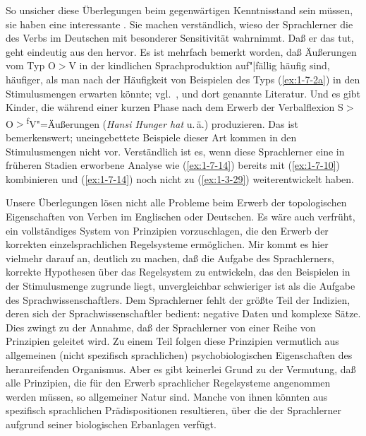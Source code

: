 \documentclass[output=paper]{langsci/langscibook}
\begin{document}
So unsicher diese Überlegungen beim gegenwärtigen Kenntnisstand sein müssen,
sie haben eine interessante . Sie machen verständlich, wieso der Sprachlerner die  des Verbs im Deutschen mit besonderer Sensitivität wahrnimmt. Daß er das tut, geht eindeutig aus den  hervor. Es ist
mehrfach bemerkt worden, daß Äußerungen vom Typ O$>$V in der kindlichen
Sprachproduktion auf"|fällig häufig sind, häufiger, als man nach der Häufigkeit von
Beispielen des Typs (\ref{ex:1-7-2a}) in den Stimulusmengen erwarten könnte; vgl.\ \citet{Park1981},
\citet{Clahsen1982} und dort genannte Literatur. Und es gibt Kinder, die während einer
kurzen Phase nach dem Erwerb der Verbalflexion S$>$O$>$\textsuperscript{f}V"=Äußerungen (\textit{Hansi Hunger hat} u.\,ä.) produzieren. Das ist bemerkenswert; uneingebettete Beispiele dieser Art kommen in den Stimulusmengen nicht vor. Verständlich ist es, wenn diese
Sprachlerner eine in früheren Stadien erworbene Analyse wie (\ref{ex:1-7-14}) bereits mit (\ref{ex:1-7-10})
kombinieren und (\ref{ex:1-7-14}) noch nicht zu (\ref{ex:1-3-29}) weiterentwickelt haben.



\ssubsection{}%
\label{subsec:1-7.4}
Unsere Überlegungen lösen nicht alle Probleme beim Erwerb der
topologischen Eigenschaften von Verben im Englischen oder
Deutschen. Es wäre auch verfrüht, ein vollständiges System von
Prinzipien vorzuschlagen, die den Erwerb der korrekten
einzelsprachlichen Regelsysteme ermöglichen. Mir kommt es hier
vielmehr darauf an, deutlich zu machen, daß die Aufgabe des
Sprachlerners, korrekte Hypothesen über das Regelsystem zu entwickeln,
das den Beispielen in der Stimulusmenge zugrunde liegt, unvergleichbar
schwieriger ist als die Aufgabe des Sprachwissenschaftlers. Dem
Sprachlerner fehlt der größte Teil der Indizien, deren sich der
Sprachwissenschaftler bedient: negative Daten und komplexe Sätze. Dies
zwingt zu der Annahme, daß der Sprachlerner von einer Reihe von
Prinzipien geleitet wird. Zu einem Teil folgen diese Prinzipien
vermutlich aus allgemeinen (nicht spezifisch sprachlichen)
psychobiologischen Eigenschaften des heranreifenden Organismus. Aber
es gibt keinerlei Grund zu der Vermutung, daß alle Prinzipien, die für
den Erwerb sprachlicher Regelsysteme angenommen werden müssen, so
allgemeiner Natur sind. Manche von ihnen könnten aus spezifisch
sprachlichen Prädispositionen resultieren, über die der Sprachlerner
aufgrund seiner biologischen Erbanlagen verfügt.
\end{document}
